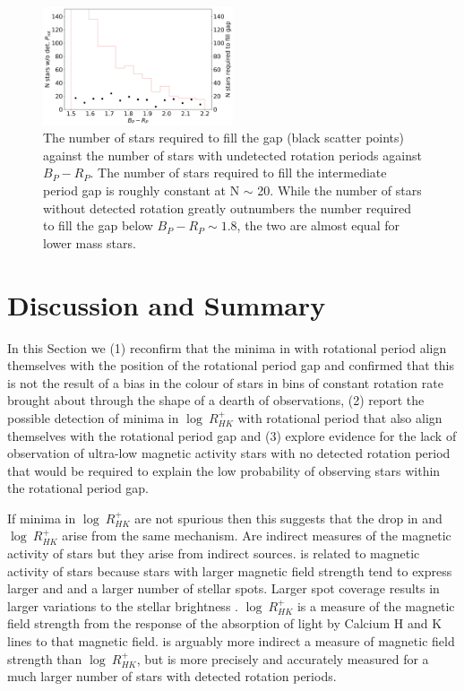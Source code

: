\begin{figure}
\centering
    \includegraphics[width=0.5\textwidth]{Figures/rot_gap_figures/stars_donot_fullgap.png}
    \caption{
    	The number of stars required to fill the gap (black scatter points) against the number of stars with undetected rotation periods against $B_P-R_P$. The number of stars required to fill the intermediate period gap is roughly constant at N $\sim$ 20. While the number of stars without detected rotation greatly outnumbers the number required to fill the gap below $B_P-R_P \sim 1.8$, the two are almost equal for lower mass stars.
}
    \label{fig:stars_not_fill}
\end{figure}




\section{Discussion and Summary}
\label{sec:disc_sum}



In this Section we (1) reconfirm that the minima in \rper{} with rotational period align themselves with the position of the rotational period gap and confirmed that this is not the result of a bias in the colour of stars in bins of constant rotation rate brought about through the shape of a dearth of observations, (2) report the possible detection of minima in $\log \ R^{+}_{HK}$  with rotational period that also align themselves with the rotational period gap and (3) explore evidence for the lack of observation of ultra-low magnetic activity stars with no detected rotation period that would be required to explain the low probability of observing stars within the rotational period gap.

If minima in $\log \ R^{+}_{HK}$ are not spurious then this suggests that the drop in \rper{} and $\log \ R^{+}_{HK}$ arise from the same mechanism.
Are indirect measures of the magnetic activity of stars but they arise from indirect sources.
 \rper{} is related to magnetic activity of stars because stars with larger magnetic field strength tend to express larger and and a larger number of stellar spots.
 Larger spot coverage results in larger variations to the stellar brightness .
 $\log \ R^{+}_{HK}$ is a measure of the magnetic field strength from the response of the absorption of light by Calcium H and K lines to that magnetic field.
 \rper{} is arguably more indirect a measure of magnetic field strength than  $\log \ R^{+}_{HK}$, but is more precisely and accurately measured for a much larger number of stars with detected rotation periods.
 
